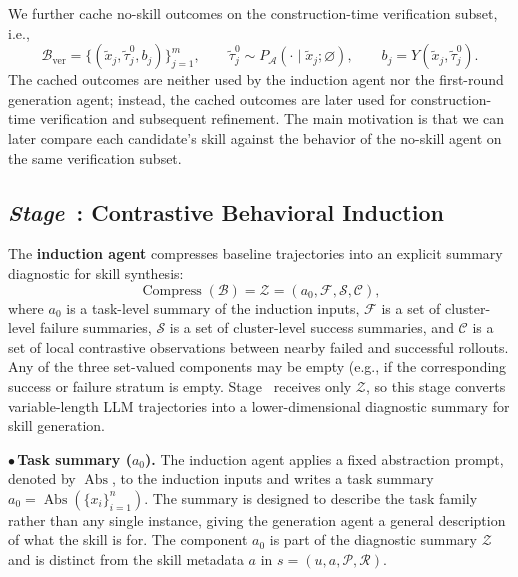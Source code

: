 \documentclass{article}
\newcommand*\circledblue[1]{\tikz[baseline=(char.base)]{
            \node[shape=circle,draw=NavyBlue!100,fill=NavyBlue!10,thick,inner sep=1pt] (char) {\scriptsize\textsf#1};}}
\begin{document}
We further cache no-skill outcomes on the construction-time verification subset, i.e.,
\begin{equation}
    \mathcal{B}_{\mathrm{ver}}
    =
    \{(\tilde{x}_j,\tilde{\tau}^{0}_{j},b_j)\}_{j=1}^{m},
    \qquad
    \tilde{\tau}^{0}_{j}\sim P_{\mathcal{A}}(\cdot\mid \tilde{x}_j;\varnothing),
    \qquad
    b_j=Y(\tilde{x}_j,\tilde{\tau}^{0}_{j}).
\end{equation}
The cached outcomes are neither used by the induction agent nor the first-round generation agent; instead, the cached outcomes are later used for construction-time verification and subsequent refinement. The main motivation is that we can later compare each candidate's skill against the behavior of the no-skill agent on the same verification subset.


\subsection{\emph{Stage}~\texorpdfstring{\protect\circledblue{2}}{(2)}: Contrastive Behavioral Induction}

The \textbf{induction agent} compresses baseline trajectories into an explicit summary diagnostic for skill synthesis:
\begin{equation}
    \operatorname{Compress}(\mathcal{B})
    =
    \mathcal{Z}=(a_0,\mathcal{F},\mathcal{S},\mathcal{C}),
\end{equation}
where $a_0$ is a task-level summary of the induction inputs, $\mathcal{F}$ is a set of cluster-level failure summaries, $\mathcal{S}$ is a set of cluster-level success summaries, and $\mathcal{C}$ is a set of local contrastive observations between nearby failed and successful rollouts. Any of the three set-valued components may be empty (e.g., if the corresponding success or failure stratum is empty. Stage~\circledblue{3} receives only $\mathcal{Z}$, so this stage converts variable-length LLM trajectories into a lower-dimensional diagnostic summary for skill generation.

\noindent$\bullet$\,\textbf{Task summary ($a_0$).}
The induction agent applies a fixed abstraction prompt, denoted by $\operatorname{Abs}$, to the induction inputs and writes a task summary $a_0=\operatorname{Abs}(\{x_i\}_{i=1}^{n})$. The summary is designed to describe the task family rather than any single instance, giving the generation agent a general description of what the skill is for. The component $a_0$ is part of the diagnostic summary $\mathcal{Z}$ and is distinct from the skill metadata $a$ in $s=(u,a,\mathcal{P},\mathcal{R})$.
\end{document}
